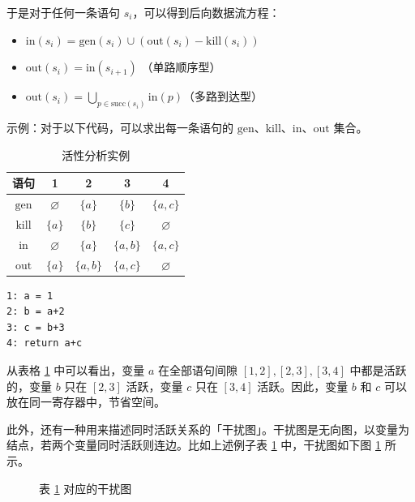 \documentclass[UTF8]{ctexart}
\newcommand\GEN{\mathrm{gen}}
\newcommand\KILL{\mathrm{kill}}
\newcommand\IN{\mathrm{in}}
\newcommand\OUT{\mathrm{out}}
\newcommand\Emph[1]{\textcolor{cyan!80!black}{#1}}
\begin{document}
于是对于任何一条语句 $s_i$，可以得到\Emph{后向}数据流方程：
\begin{itemize}[leftmargin=1.5cm]
  \item $\IN(s_i) = \GEN(s_i) \cup (\OUT(s_i) - \KILL(s_i))$
  \item $\OUT(s_i) = \IN (s_{i+1})$ （单路顺序型）
  \item $\OUT(s_i) = \bigcup\limits_{p\in\mathrm{succ}(s_i)} \IN(p)$（多路到达型）
\end{itemize}

示例：对于以下代码，可以求出每一条语句的 $\GEN$、$\KILL$、$\IN$、$\OUT$ 集合。

\begin{table}[htb]
    \begin{minipage}[c]{.7\textwidth}
        \centering
        \vspace{0pt}
        \small
        \begin{tabular}{ccccc}
        \toprule
        语句 & 1 & 2 & 3 & 4 \\
        \midrule
        $\GEN$ & $\varnothing$ & $\{a\}$ & $\{b\}$ & $\{a,c\}$ \\
        $\KILL$ & $\{a\}$ & $\{b\}$ & $\{c\}$ & $\varnothing$ \\
        \midrule
        $\IN$  & $\varnothing$ & $\{a\}$ & $\{a,b\}$  & $\{a,c\}$\\
        $\OUT$ & $\{a\}$ & $\{a,b\}$ & $\{a,c\}$ & $\varnothing$\\
        \bottomrule
        \end{tabular}
    \end{minipage}
    \begin{minipage}[c]{.29\textwidth}
        \centering\small
        \begin{verbatim}
1: a = 1
2: b = a+2
3: c = b+3
4: return a+c
        \end{verbatim}
    \end{minipage}
    \caption{活性分析实例}\label{tab:活性分析}
\end{table}
从表格 \ref{tab:活性分析} 中可以看出，变量 $a$ 在全部语句间隙 $[1,2],[2,3],[3,4]$ 中都是活跃的，变量 $b$ 只在 $[2,3]$ 活跃，变量 $c$ 只在 $[3,4]$ 活跃。因此，变量 $b$ 和 $c$ 可以放在同一寄存器中，节省空间。

此外，还有一种用来描述同时活跃关系的「干扰图」。干扰图是无向图，以变量为结点，若两个变量同时活跃则连边。比如上述例子表 \ref{tab:活性分析} 中，干扰图如下图 \ref{fig:干扰图} 所示。
\begin{figure}[htb]
    \centering
    \caption{表 \ref{tab:活性分析} 对应的干扰图}\label{fig:干扰图}
\end{figure}
\end{document}
